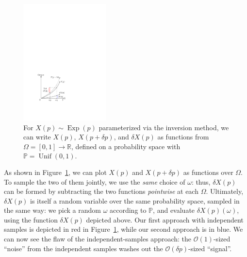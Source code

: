 \begin{figure}[t]
    \centering
    \includegraphics[width=0.4\textwidth]{figures/exp_for_matrixcalc.pdf}
    \caption{For $X(p) \sim \operatorname{Exp}(p)$ parameterized via the inversion method, we can write $X(p)$, $X(p+\delta p)$, and
    $\delta X(p)$ as functions from $\Omega = [0,1] \to \mathbb{R}$, defined on a probability space with
    $\mathbb{P} = \operatorname{Unif}(0,1)$.}
    \label{fig:exp}
\end{figure}
As shown in Figure~\ref{fig:exp}, we can plot $X(p)$ and $X(p+\delta p)$ as functions over $\Omega$.
To sample the two of them jointly, we use the \emph{same} choice of $\omega$:
thus, $\delta X(p)$ can be formed by subtracting the two functions \emph{pointwise} at each $\Omega$. 
Ultimately, $\delta X(p)$ is itself a random variable over the same probability space, sampled in the same way: 
we pick a random $\omega$ according to $\mathbb{P}$, and evaluate $\delta X(p)(\omega)$, using the function $\delta X(p)$ depicted above.
Our first approach with independent samples is depicted in red in Figure~\ref{fig:exp}, while our second approach is in blue.
We can now see the flaw of the independent-samples approach: the $\mathcal{O}(1)$-sized ``noise'' from the independent samples washes out
the $\mathcal{O}(\delta p)$-sized ``signal''.

